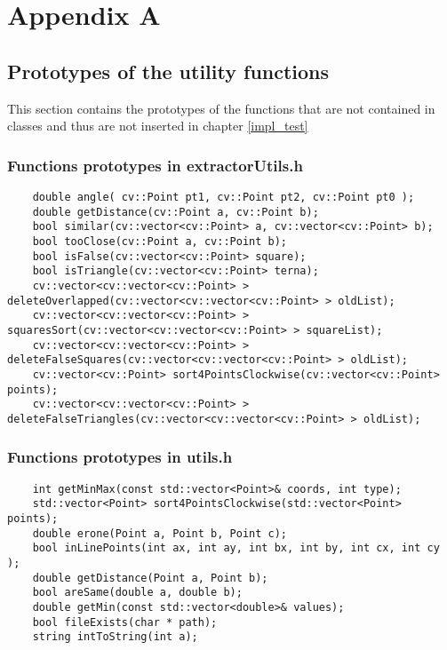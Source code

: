 \appendix
\chapter{Appendix A}\label{appA}

	\section{Prototypes of the utility functions}
	This section contains the prototypes of the functions that are not contained in classes and thus are not inserted in chapter \ref{impl_test}
	
	\subsection*{Functions prototypes in extractorUtils.h}
	\begin{lstlisting}
	double angle( cv::Point pt1, cv::Point pt2, cv::Point pt0 );
	double getDistance(cv::Point a, cv::Point b);
	bool similar(cv::vector<cv::Point> a, cv::vector<cv::Point> b);
	bool tooClose(cv::Point a, cv::Point b);
	bool isFalse(cv::vector<cv::Point> square);
	bool isTriangle(cv::vector<cv::Point> terna);
	cv::vector<cv::vector<cv::Point> > deleteOverlapped(cv::vector<cv::vector<cv::Point> > oldList);
	cv::vector<cv::vector<cv::Point> > squaresSort(cv::vector<cv::vector<cv::Point> > squareList);
	cv::vector<cv::vector<cv::Point> > deleteFalseSquares(cv::vector<cv::vector<cv::Point> > oldList);
	cv::vector<cv::Point> sort4PointsClockwise(cv::vector<cv::Point> points);
	cv::vector<cv::vector<cv::Point> > deleteFalseTriangles(cv::vector<cv::vector<cv::Point> > oldList);
	\end{lstlisting}

	\subsection*{Functions prototypes in utils.h}
	\begin{lstlisting}
	int getMinMax(const std::vector<Point>& coords, int type);
	std::vector<Point> sort4PointsClockwise(std::vector<Point> points);
	double erone(Point a, Point b, Point c);
	bool inLinePoints(int ax, int ay, int bx, int by, int cx, int cy );
	double getDistance(Point a, Point b);
	bool areSame(double a, double b);
	double getMin(const std::vector<double>& values);
	bool fileExists(char * path);
	string intToString(int a);
	\end{lstlisting}


	
